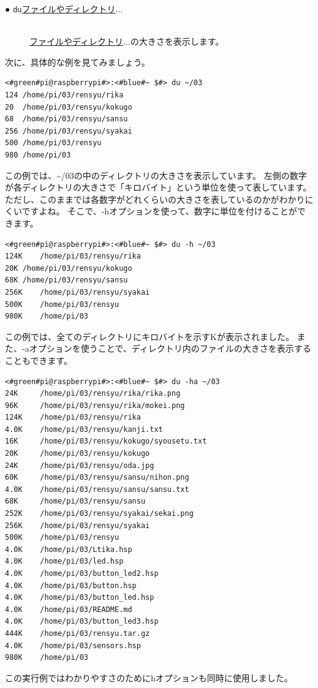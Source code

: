 \documentclass[text03.tex]{subfiles}
\begin{document}
\begin{description}
    \item[● \texttt{du}\textvisiblespace \underline{ファイルやディレクトリ}$\ldots$]\mbox{}\\
    \underline{ファイルやディレクトリ}$\ldots$の大きさを表示します。
\end{description}
次に、具体的な例を見てみましょう。
\begin{lstlisting}[caption=duコマンドの実行例, label=du_example]
<#green#pi@raspberrypi#>:<#blue#~ $#> du ~/03
124	/home/pi/03/rensyu/rika
20	/home/pi/03/rensyu/kokugo
68	/home/pi/03/rensyu/sansu
256	/home/pi/03/rensyu/syakai
500	/home/pi/03/rensyu
980	/home/pi/03
\end{lstlisting}
この例では、\textasciitilde/03の中のディレクトリの大きさを表示しています。
左側の数字が各ディレクトリの大きさで「キロバイト」という単位を使って表しています。
ただし、このままでは各数字がどれくらいの大きさを表しているのかがわかりにくいですよね。
そこで、-hオプションを使って、数字に単位を付けることができます。
\begin{lstlisting}[caption=du -hの実行例, label=du_example]
<#green#pi@raspberrypi#>:<#blue#~ $#> du -h ~/03
124K	/home/pi/03/rensyu/rika
20K	/home/pi/03/rensyu/kokugo
68K	/home/pi/03/rensyu/sansu
256K	/home/pi/03/rensyu/syakai
500K	/home/pi/03/rensyu
980K	/home/pi/03
\end{lstlisting}
この例では、全てのディレクトリにキロバイトを示すKが表示されました。
また、-aオプションを使うことで、ディレクトリ内のファイルの大きさを表示することもできます。
\begin{lstlisting}[caption=du -haの実行例, label=du_example]
<#green#pi@raspberrypi#>:<#blue#~ $#> du -ha ~/03
24K     /home/pi/03/rensyu/rika/rika.png
96K     /home/pi/03/rensyu/rika/mokei.png
124K	/home/pi/03/rensyu/rika
4.0K	/home/pi/03/rensyu/kanji.txt
16K     /home/pi/03/rensyu/kokugo/syousetu.txt
20K     /home/pi/03/rensyu/kokugo
24K     /home/pi/03/rensyu/oda.jpg
60K     /home/pi/03/rensyu/sansu/nihon.png
4.0K	/home/pi/03/rensyu/sansu/sansu.txt
68K     /home/pi/03/rensyu/sansu
252K	/home/pi/03/rensyu/syakai/sekai.png
256K	/home/pi/03/rensyu/syakai
500K	/home/pi/03/rensyu
4.0K	/home/pi/03/Ltika.hsp
4.0K	/home/pi/03/led.hsp
4.0K	/home/pi/03/button_led2.hsp
4.0K	/home/pi/03/button.hsp
4.0K	/home/pi/03/button_led.hsp
4.0K	/home/pi/03/README.md
4.0K	/home/pi/03/button_led3.hsp
444K	/home/pi/03/rensyu.tar.gz
4.0K	/home/pi/03/sensors.hsp
980K	/home/pi/03
\end{lstlisting}
この実行例ではわかりやすさのためにhオプションも同時に使用しました。
\end{document}
